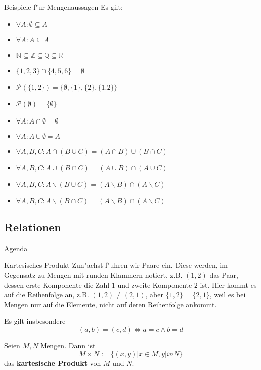 \documentclass{beamer}
\begin{document}
\begin{frame}{Beispiele f"ur Mengenaussagen}
Es gilt:
\begin{itemize}
  \item $\forall A:\emptyset\subseteq A$
  \item $\forall A:A\subseteq A$
  \item $\mathbb{N}\subseteq\mathbb{Z}\subseteq\mathbb{Q}\subseteq\mathbb{R}$
  \item $\{1,2,3\}\cap\{4,5,6\}=\emptyset$
  \item $\mathscr{P}(\{1,2\})=\{\emptyset,\{1\},\{2\},\{1.2\}\}$
  \item $\mathscr{P}(\emptyset)=\{\emptyset\}$
  \item $\forall A: A\cap\emptyset=\emptyset$
  \item $\forall A:A\cup\emptyset=A$
  \item $\forall A,B,C: A\cap(B\cup C)=(A\cap B)\cup (B\cap C)$
  \item $\forall A,B,C: A\cup (B\cap C)=(A\cup B)\cap (A\cup C)$
  \item $\forall A,B,C: A\backslash(B\cup C)=(A\backslash B)\cap (A\backslash C)$
  \item $\forall A,B,C: A\backslash(B\cap C)=(A\backslash B)\cap (A\backslash C)$
\end{itemize}

\end{frame}
\subsection{Relationen}
\begin{frame}{Agenda}
   
    
  \tableofcontents[currentsection]
  \end{frame}
\begin{frame}{Kartesisches Produkt}
  Zun"achst f"uhren wir Paare ein. Diese werden, im Gegensatz zu Mengen mit runden Klammern notiert, z.B.
  $(1,2)$ das Paar, dessen erste Komponente die Zahl $1$ und zweite Komponente $2$ ist. Hier kommt es auf die Reihenfolge an, z.B. $(1,2)\neq(2,1)$, aber $\{1,2\}=\{2,1\}$, weil 
  es bei Mengen nur auf die Elemente, nicht auf deren Reihenfolge ankommt.
  
  Es gilt insbesondere \[(a,b)=(c,d)\Leftrightarrow a=c\wedge b=d\]
  \begin{definition}
    Seien $M,N$ Mengen. Dann ist \[M\times N:=\{(x,y)|x\in M,y|in N\}\] das \textbf{kartesische Produkt} von $M$ und $N$.
  \end{definition}
  
\end{frame}
\end{document}
